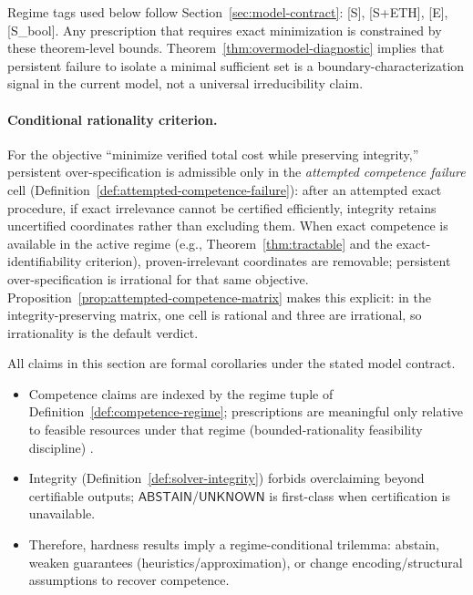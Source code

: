 Regime tags used below follow Section~\ref{sec:model-contract}: [S], [S+ETH], [E], [S\_bool].
Any prescription that requires exact minimization is constrained by these theorem-level bounds.
Theorem~\ref{thm:overmodel-diagnostic} implies that persistent failure to isolate a minimal sufficient set is a boundary-characterization signal in the current model, not a universal irreducibility claim.

\paragraph{Conditional rationality criterion.}
For the objective ``minimize verified total cost while preserving integrity,'' persistent over-specification is admissible only in the \emph{attempted competence failure} cell (Definition~\ref{def:attempted-competence-failure}): after an attempted exact procedure, if exact irrelevance cannot be certified efficiently, integrity retains uncertified coordinates rather than excluding them.
When exact competence is available in the active regime (e.g., Theorem~\ref{thm:tractable} and the exact-identifiability criterion), proven-irrelevant coordinates are removable; persistent over-specification is irrational for that same objective.
Proposition~\ref{prop:attempted-competence-matrix} makes this explicit: in the integrity-preserving matrix, one cell is rational and three are irrational, so irrationality is the default verdict.

\begin{remark}
All claims in this section are formal corollaries under the stated model contract.
\begin{itemize}
\item Competence claims are indexed by the regime tuple of Definition~\ref{def:competence-regime}; prescriptions are meaningful only relative to feasible resources under that regime (bounded-rationality feasibility discipline) \cite{sep_bounded_rationality,arora2009computational}.
\item Integrity (Definition~\ref{def:solver-integrity}) forbids overclaiming beyond certifiable outputs; $\mathsf{ABSTAIN}$/$\mathsf{UNKNOWN}$ is first-class when certification is unavailable.
\item Therefore, hardness results imply a regime-conditional trilemma: abstain, weaken guarantees (heuristics/approximation), or change encoding/structural assumptions to recover competence.
\end{itemize}
\end{remark}

